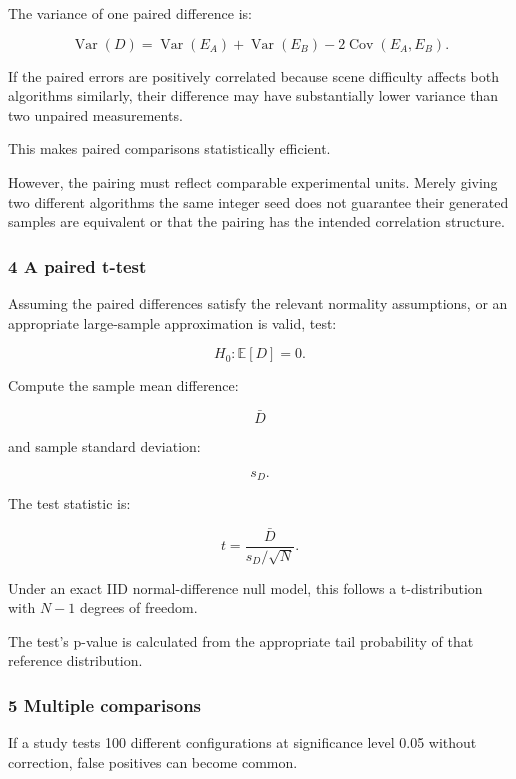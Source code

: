 The variance of one paired difference is:

\[
 \operatorname{Var}(D) = \operatorname{Var}(E_A)+ \operatorname{Var}(E_B)- 2\operatorname{Cov}(E_A,E_B).
\]

If the paired errors are positively correlated because scene difficulty affects both algorithms similarly, their difference may have substantially lower variance than two unpaired measurements.

This makes paired comparisons statistically efficient.

However, the pairing must reflect comparable experimental units. Merely giving two different algorithms the same integer seed does not guarantee their generated samples are equivalent or that the pairing has the intended correlation structure.

\subsubsection{4 A paired t-test}\label{02-foundations-ii-ch030-a-paired-t-test}

\hypertarget{02-foundations-ii-ch030-a-paired-t-test}{}

Assuming the paired differences satisfy the relevant normality assumptions, or an appropriate large-sample approximation is valid, test:

\[
 H_0:\mathbb E[D]=0.
\]

Compute the sample mean difference:

\[
 \bar D
\]

and sample standard deviation:

\[
 s_D.
\]

The test statistic is:

\[
 \boxed{ t= \frac{\bar D}{s_D/\sqrt N} }.
\]

Under an exact IID normal-difference null model, this follows a t-distribution with \(N-1\) degrees of freedom.

The test's p-value is calculated from the appropriate tail probability of that reference distribution.

\subsubsection{5 Multiple comparisons}\label{02-foundations-ii-ch030-multiple-comparisons}

\hypertarget{02-foundations-ii-ch030-multiple-comparisons}{}

If a study tests 100 different configurations at significance level 0.05 without correction, false positives can become common.

